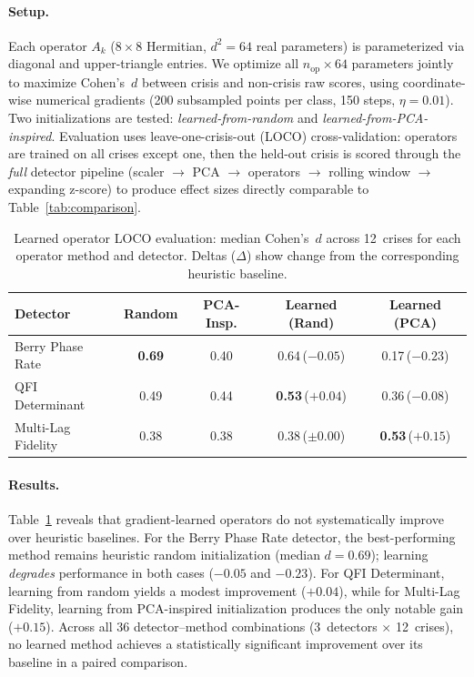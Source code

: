 \paragraph{Setup.}
Each operator $A_k$ ($8 \times 8$ Hermitian, $d^2 = 64$ real
parameters) is parameterized via diagonal and upper-triangle entries.
We optimize all $n_{\mathrm{op}} \times 64$ parameters jointly to
maximize Cohen's~$d$ between crisis and non-crisis raw scores, using
coordinate-wise numerical gradients (200 subsampled points per class,
150 steps, $\eta = 0.01$).  Two initializations are tested:
\emph{learned-from-random} and \emph{learned-from-PCA-inspired}.
Evaluation uses leave-one-crisis-out (LOCO) cross-validation: operators
are trained on all crises except one, then the held-out crisis is
scored through the \emph{full} detector pipeline (scaler $\to$ PCA $\to$
operators $\to$ rolling window $\to$ expanding z-score) to produce
effect sizes directly comparable to Table~\ref{tab:comparison}.

\begin{table}[htb]
\centering
\caption{Learned operator LOCO evaluation: median Cohen's~$d$ across
  12~crises for each operator method and detector.  Deltas ($\Delta$)
  show change from the corresponding heuristic baseline.}
\label{tab:learned_operators}
\small
\begin{tabular}{lcccc}
\toprule
Detector & Random & PCA-Insp. & Learned (Rand) & Learned (PCA) \\
\midrule
Berry Phase Rate    & \textbf{0.69}  & 0.40  & 0.64\,{\scriptsize($-0.05$)}  & 0.17\,{\scriptsize($-0.23$)}  \\
QFI Determinant     & 0.49  & 0.44  & \textbf{0.53}\,{\scriptsize($+0.04$)}  & 0.36\,{\scriptsize($-0.08$)}  \\
Multi-Lag Fidelity  & 0.38  & 0.38  & 0.38\,{\scriptsize($\pm0.00$)}  & \textbf{0.53}\,{\scriptsize($+0.15$)}  \\
\bottomrule
\end{tabular}

\medskip
{}
\end{table}

\paragraph{Results.}
Table~\ref{tab:learned_operators} reveals that gradient-learned operators
do not systematically improve over heuristic baselines.  For the Berry
Phase Rate detector, the best-performing method remains heuristic random
initialization (median $d = 0.69$); learning \emph{degrades} performance
in both cases ($-0.05$ and $-0.23$).  For QFI Determinant, learning
from random yields a modest improvement ($+0.04$), while for Multi-Lag
Fidelity, learning from PCA-inspired initialization produces the only
notable gain ($+0.15$).  Across all 36 detector--method combinations
(3~detectors $\times$ 12~crises), no learned method achieves a
statistically significant improvement over its baseline in a paired
comparison.

